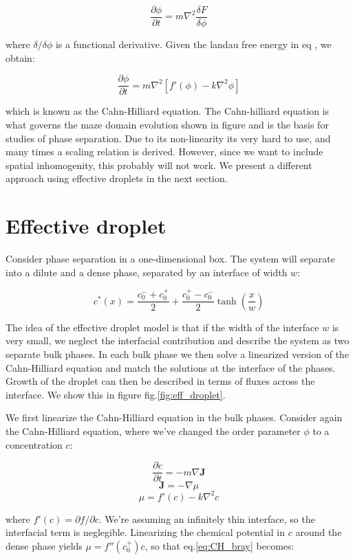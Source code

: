\documentclass[12pt,a4paper,]{Dissertate}
\begin{document}
\[
\frac{\partial \phi}{\partial t} = m \nabla^2 \frac{\delta F}{\delta \phi}
\]

where \(\delta/\delta \phi\) is a functional derivative. Given the
landau free energy in eq , we obtain:

\[
\frac{\partial \phi}{\partial t}=m\nabla^2[f'(\phi)-k\nabla^2\phi]
\]

which is known as the Cahn-Hilliard equation. The Cahn-hilliard equation
is what governs the maze domain evolution shown in figure and is the
basis for studies of phase separation. Due to its non-linearity its very
hard to use, and many times a scaling relation is derived. However,
since we want to include spatial inhomogenity, this probably will not
work. We present a different approach using effective droplets in the
next section.

\hypertarget{effective-droplet}{%
\section{Effective droplet}\label{effective-droplet}}

Consider phase separation in a one-dimensional box. The system will
separate into a dilute and a dense phase, separated by an interface of
width \(w\):

\[
c^*(x) = \frac{c_0^-+c_0^+}{2}+\frac{c_0^+-c_0^-}{2}\tanh\left(\frac{x}{w}\right)
\]

The idea of the effective droplet model is that if the width of the
interface \(w\) is very small, we neglect the interfacial contribution
and describe the system as two separate bulk phases. In each bulk phase
we then solve a linearized version of the Cahn-Hilliard equation and
match the solutions at the interface of the phases. Growth of the
droplet can then be described in terms of fluxes across the interface.
We show this in figure fig.\ref{fig:eff_droplet}.

We first linearize the Cahn-Hilliard equation in the bulk phases.
Consider again the Cahn-Hilliard equation, where we've changed the order
parameter \(\phi\) to a concentration \(c\):

\[
\frac{\partial c }{\partial t} = -m\nabla\mathbf{J}
\] \[
\mathbf{J} = -\nabla \mu
\] \begin{equation}
\mu = f'(c) - k\nabla^2c
\label{eq:CH_bray}\end{equation}

where \(f'(c)=\partial f/\partial c\). We're assuming an infinitely thin
interface, so the interfacial term is neglegible. Linearizing the
chemical potential in \(c\) around the dense phase yields
\(\mu = f''(c_0^+)c\), so that eq.\ref{eq:CH_bray} becomes:
\end{document}
